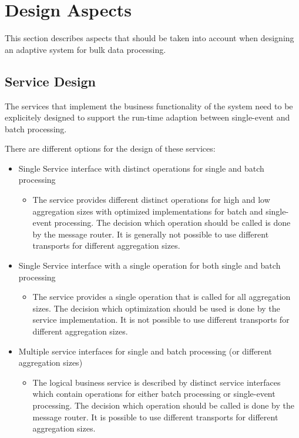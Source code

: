 \section{Design Aspects}
\label{sec:ch05_design_aspects}
This section describes aspects that should be taken into account when designing an adaptive system for bulk data processing.

\subsection{Service Design}
\label{sec:ch05_service_design}

The services that implement the business functionality of the system need to be explicitely designed to support the run-time adaption between single-event and batch processing. 

There are different options for the design of these services:
\begin{itemize}
	\item Single Service interface with distinct operations for single and batch processing
	\begin{itemize}
		\item The service provides different distinct operations for high and low aggregation sizes with optimized implementations for batch and single-event processing. The decision which operation should be called is done by the message router. It is generally not possible to use different transports for different aggregation sizes.
	\end{itemize}
	\item Single Service interface with a single operation for both single and batch processing
	\begin{itemize}
		\item The service provides a single operation that is called for all aggregation sizes. The decision which optimization should be used is done by the service implementation. It is not possible to use different transports for different aggregation sizes.
	\end{itemize}
	\item Multiple service interfaces for single and batch processing (or different aggregation sizes)
	\begin{itemize}
		\item The logical business service is described by distinct service interfaces which contain operations for either batch processing or single-event processing. The decision which operation should be called is done by the message router. It is possible to use different transports for different aggregation sizes.
	\end{itemize}
\end{itemize}

